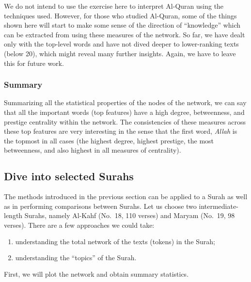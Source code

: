 \documentclass[
]{article}
\providecommand{\tightlist}{%
  \setlength{\itemsep}{0pt}\setlength{\parskip}{0pt}}
\begin{document}
We do not intend to use the exercise here to interpret Al-Quran using the techniques used. However, for those who studied Al-Quran, some of the things shown here will start to make some sense of the direction of ``knowledge'' which can be extracted from using these measures of the network. So far, we have dealt only with the top-level words and have not dived deeper to lower-ranking texts (below 20), which might reveal many further insights. Again, we have to leave this for future work.

\hypertarget{summary}{%
\subsubsection{Summary}\label{summary}}

Summarizing all the statistical properties of the nodes of the network, we can say that all the important words (top features) have a high degree, betweenness, and prestige centrality within the network. The consistencies of these measures across these top features are very interesting in the sense that the first word, \emph{Allah} is the topmost in all cases (the highest degree, highest prestige, the most betweenness, and also highest in all measures of centrality).

\hypertarget{dive-into-selected-surahs}{%
\subsection{Dive into selected Surahs}\label{dive-into-selected-surahs}}

The methods introduced in the previous section can be applied to a Surah as well as in performing comparisons between Surahs. Let us choose two intermediate-length Surahs, namely Al-Kahf (No.~18, 110 verses) and Maryam (No.~19, 98 verses). There are a few approaches we could take:

\begin{enumerate}
\def\labelenumi{\alph{enumi})}
\tightlist
\item
  understanding the total network of the texts (tokens) in the Surah;
\item
  understanding the ``topics'' of the Surah.
\end{enumerate}

First, we will plot the network and obtain summary statistics.
\end{document}
